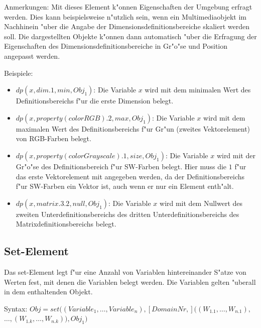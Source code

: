 \bigskip\noindent
Anmerkungen:
Mit dieses Element k"onnen Eigenschaften der Umgebung erfragt werden.
Dies kann beispielsweise n"utzlich sein, wenn ein Multimediaobjekt im Nachhinein "uber die Angabe der Dimensionsdefinitionsbereiche skaliert werden soll. Die dargestellten Objekte k"onnen dann automatisch "uber die Erfragung der Eigenschaften des Dimensionsdefinitionsbereiche in Gr"o"se und Position angepasst werden.

\bigskip\noindent
Beispiele:
\begin{itemize}
 \item $dp( x , dim.1, min, Obj_1 )$: Die Variable $x$ wird mit dem minimalen Wert des Definitionsbereichs f"ur die erste Dimension belegt.
 \item $dp( x , property( colorRGB).2, max, Obj_1 )$: Die Variable $x$ wird mit dem maximalen Wert des Definitionsbereichs f"ur Gr"un (zweites Vektorelement) von RGB-Farben belegt.
 \item $dp( x , property( colorGrayscale).1, size, Obj_1 )$: Die Variable $x$ wird mit der Gr"o"se des Definitionsbereich f"ur SW-Farben belegt. Hier muss die $1$ f"ur das erste Vektorelement mit angegeben werden, da der Definitionsbereichs f"ur SW-Farben ein Vektor ist, auch wenn er nur ein Element enth"alt.
 \item $dp( x , matrix.3.2, null, Obj_1 )$: Die Variable $x$ wird mit dem Nullwert des zweiten Unterdefinitionsbereichs des dritten Unterdefinitionsbereichs des Matrixdefinitionsbereichs belegt.
\end{itemize}



\subsection{Set-Element}
\label{secFibSetElement}

\bigskip\noindent
Das set-Element legt f"ur eine Anzahl von Variablen hintereinander S"atze von Werten fest, mit denen die Variablen belegt werden. Die Variablen gelten "uberall in dem enthaltenden Objekt.

\bigskip\noindent
Syntax:
$Obj = set( (Variable_1, \ldots, Variable_n), [DomainNr,]( (W_{1.1}, \ldots, W_{n.1}),$\\ $ \ldots, (W_{1.k}, \ldots, W_{n.k}) ), Obj_1)$

